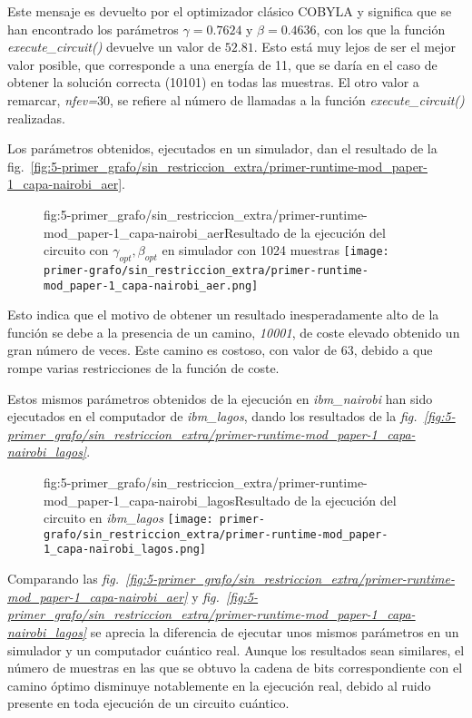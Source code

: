 Este mensaje es devuelto por el optimizador clásico COBYLA y significa que se han encontrado los parámetros $\gamma = 0.7624$ y $\beta = 0.4636$, con los que la función \textit{execute\_circuit()} devuelve un valor de $52.81$.
Esto está muy lejos de ser el mejor valor posible, que corresponde a una energía de 11, que se daría en el caso de obtener la solución correcta (10101) en todas las muestras.
El otro valor a remarcar, \textit{nfev=$30$}, se refiere al número de llamadas a la función \textit{execute\_circuit()} realizadas.

Los parámetros obtenidos, ejecutados en un simulador, dan el resultado de la fig.~\ref{fig:5-primer_grafo/sin_restriccion_extra/primer-runtime-mod_paper-1_capa-nairobi_aer}.

\begin{figure}[Resultados QAOA {--} artículo de Urgelles \textit{et al.} (2022) {--} ejecución en simulador]{fig:5-primer_grafo/sin_restriccion_extra/primer-runtime-mod_paper-1_capa-nairobi_aer}{Resultado de la ejecución del circuito con $\gamma_{opt}, \beta_{opt}$ en simulador con 1024 muestras}
  \centering
  \texttt{[image: primer-grafo/sin\_restriccion\_extra/primer-runtime-mod\_paper-1\_capa-nairobi\_aer.png]}
\end{figure}

Esto indica que el motivo de obtener un resultado inesperadamente alto de la función se debe a la presencia de un camino, \textit{10001}, de coste elevado obtenido un gran número de veces. Este camino es costoso, con valor de 63, debido a que rompe varias restricciones de la función de coste.

Estos mismos parámetros obtenidos de la ejecución en \textit{ibm\_nairobi} han sido ejecutados en el computador de \textit{ibm\_lagos}, dando los resultados de la \textit{fig.~\ref{fig:5-primer_grafo/sin_restriccion_extra/primer-runtime-mod_paper-1_capa-nairobi_lagos}}.

\begin{figure}[Resultados QAOA {--} artículo de Urgelles \textit{et al.} (2022) {--} ejecución en computador real]{fig:5-primer_grafo/sin_restriccion_extra/primer-runtime-mod_paper-1_capa-nairobi_lagos}{Resultado de la ejecución del circuito en \textit{ibm\_lagos}}
  \centering
  \texttt{[image: primer-grafo/sin\_restriccion\_extra/primer-runtime-mod\_paper-1\_capa-nairobi\_lagos.png]}
\end{figure}

Comparando las \textit{fig.~\ref{fig:5-primer_grafo/sin_restriccion_extra/primer-runtime-mod_paper-1_capa-nairobi_aer}} y \textit{fig.~\ref{fig:5-primer_grafo/sin_restriccion_extra/primer-runtime-mod_paper-1_capa-nairobi_lagos}}
se aprecia la diferencia de ejecutar unos mismos parámetros en un simulador y un computador cuántico real.
Aunque los resultados sean similares, el número de muestras en las que se obtuvo la cadena de bits correspondiente con el camino óptimo disminuye notablemente en la ejecución real, debido al ruido presente en toda ejecución de un circuito cuántico.


